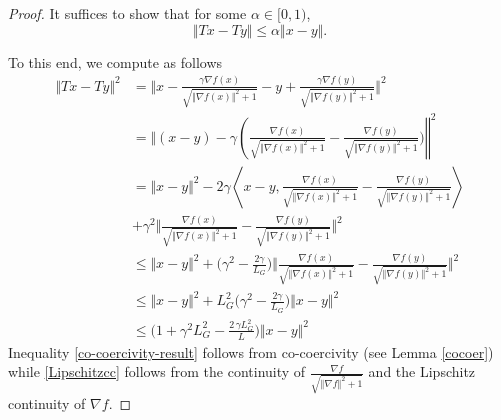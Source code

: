 \documentclass[10pt,a4paper]{amsart}
\begin{document}
\begin{proof}
It suffices to show that for some $\alpha \in [0,1)$,
\begin{equation}
    \Vert Tx - Ty \Vert \le \alpha \Vert x - y \Vert.
\end{equation}

\noindent
To this end, we compute as follows
\begin{align}
\Vert Tx - Ty \Vert^2  &= \bigg\Vert x - \frac{\gamma\nabla f(x)}{\sqrt{\Vert\nabla f(x)\Vert^2 +1}}-y + \frac{\gamma\nabla f(y)}{\sqrt{\Vert\nabla f(y)\Vert^2 +1}}\bigg\Vert^2 \nonumber\\
&=\bigg\Vert (x -y)- \gamma\left ( \frac{\nabla f(x)}{\sqrt{\Vert\nabla f(x) \Vert^2 +1}} - \frac{\nabla f(y)}{\sqrt{\Vert\nabla f(y)\Vert^2 +1}} \bigg )\right\Vert^2 \nonumber\\
&= \Vert x -y\Vert^2 - 2\gamma \left \langle x -y,\frac{\nabla f(x)}{\sqrt{\Vert\nabla f(x)\Vert^2 +1}} - \frac{\nabla f(y)}{\sqrt{\Vert\nabla f(y)\Vert^2 +1} }\right \rangle \nonumber\\
&+\gamma^2\bigg\Vert \frac{\nabla f(x)}{\sqrt{\Vert\nabla f(x)\Vert^2 +1}} - \frac{\nabla f(y)}{\sqrt{\Vert\nabla f(y) \Vert^2 +1}} \bigg\Vert^2 \nonumber\\
%
 & \leq \bigg\Vert x -y\bigg\Vert^2+\bigg ( \gamma^2- \frac{2\gamma}{L_G} \bigg )\Bigg \Vert \frac{\nabla f(x)}{\sqrt{\Vert\nabla f(x)\Vert^2 +1}} - \frac{\nabla f(y)}{\sqrt{\Vert\nabla f(y)\Vert^2 +1}} \Bigg\Vert^2 \label{co-coercivity-result}\\
&\leq \Vert x - y \Vert^2 + L_G^2 \bigg ( \gamma^2- \frac{2\gamma}{L_G} \bigg ) \Vert x -y \Vert^2 \label{Lipschitzcc}\\
& \le  \bigg (1 + \gamma^2 L_G^2- \frac{2 \, \gamma L_G^2}{L} \bigg ) \Vert x -y \Vert^2 
\end{align}
Inequality \eqref{co-coercivity-result} follows from co-coercivity (see Lemma \ref{cocoer}) while \ref{Lipschitzcc} follows from the continuity of $\displaystyle \frac{\nabla f}{\sqrt{\Vert \nabla f \Vert^2 + 1}} $ and the Lipschitz continuity of $\nabla f$.
\end{proof}
\end{document}

